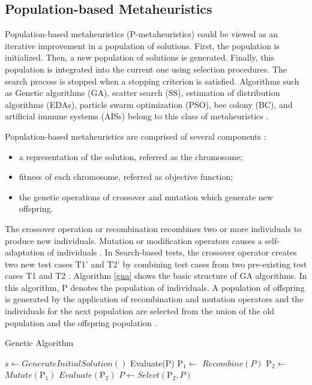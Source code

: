 \documentclass[espaco=umemeio,chapter=TITLE,twoside,openright]{abnt}
\begin{document}
\subsection{Population-based Metaheuristics}

Population-based metaheuristics (P-metaheuristics) could be viewed as an iterative improvement in a population of solutions. First, the population is initialized. Then, a new population of solutions is generated. Finally, this population is integrated into the current one using  selection procedures. The search process is stopped when a stopping criterion is satisfied. Algorithms such as Genetic algorithms (GA), scatter search (SS), estimation of distribution algorithms (EDAs), particle swarm optimization (PSO), bee colony (BC), and artificial immune systems (AISs) belong to this class of metaheuristics \cite{talbi2009metaheuristics}.

Population-based metaheuristics are comprised of several components \cite{hong2000simultaneously} \cite{shousha2003performance} :

\begin{itemize}
\item a representation of the solution, referred as the chromosome;
\item fitness of each chromosome, referred as objective function;
\item the genetic operations of crossover and mutation which generate new offspring.
\end{itemize}

The crossover operation or recombination recombines two or more individuals to produce new individuals. Mutation or modification operators causes a self-adaptation of individuals \cite{Blum2003}. In Search-based tests, the crossover operator creates two new test cases T1' and T2' by combining test cases from two pre-existing test cases T1 and T2 \cite{Aleti2016}. Algorithm \ref{gna} shows the basic structure of GA algorithms. In this algorithm, P denotes the population of individuals. A population of offspring is generated by the application of recombination and mutation operators and the individuals for the next population are selected from the union of the old population and the offspring population \cite{raidl2010metaheuristic}.


\begin{algorithm}[h]
  \caption{Genetic Algorithm}\label{gna}
  \begin{algorithmic}[1]

    \State $s\gets GenerateInitialSolution()$
    \State Evaluate(P)
    \State $\mbox{P}_1\gets$ $Recombine(P)$
    \State $\mbox{P}_2\gets$ $Mutate(\mbox{P}_1)$
    \State $Evaluate(\mbox{P}_2)$
    \State $P\gets Select(\mbox{P}_2,P)$
    \EndWhile

  \end{algorithmic}
\end{algorithm}
\end{document}
